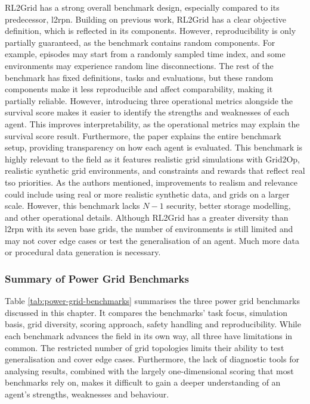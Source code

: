 RL2Grid has a strong overall benchmark design, especially compared to its predecessor, \ac{l2rpn}. Building on previous work, RL2Grid has a clear objective definition, which is reflected in its components. 
However, reproducibility is only partially guaranteed, as the benchmark contains random components. For example, episodes may start from a randomly sampled time index, and some environments may experience random line disconnections. The rest of the benchmark has fixed definitions, tasks and evaluations, but these random components make it less reproducible and affect comparability, making it partially reliable. However, introducing three operational metrics alongside the survival score makes it easier to identify the strengths and weaknesses of each agent. This improves interpretability, as the operational metrics may explain the survival score result. Furthermore, the paper explains the entire benchmark setup, providing transparency on how each agent is evaluated. 
This benchmark is highly relevant to the field as it features realistic grid simulations with Grid2Op, realistic synthetic grid environments, and constraints and rewards that reflect real \ac{tso} priorities. As the authors mentioned, improvements to realism and relevance could include using real or more realistic synthetic data, and grids on a larger scale. However, this benchmark lacks $N-1$ security, better storage modelling, and other operational details. 
Although RL2Grid has a greater diversity than \ac{l2rpn} with its seven base grids, the number of environments is still limited and may not cover edge cases or test the generalisation of an agent. Much more data or procedural data generation is necessary. 


\subsubsection{Summary of Power Grid Benchmarks}
Table \ref{tab:power-grid-benchmarks} summarises the three power grid benchmarks discussed in this chapter. It compares the benchmarks' task focus, simulation basis, grid diversity, scoring approach, safety handling and reproducibility. While each benchmark advances the field in its own way, all three have limitations in common. The restricted number of grid topologies limits their ability to test generalisation and cover edge cases. Furthermore, the lack of diagnostic tools for analysing results, combined with the largely one-dimensional scoring that most benchmarks rely on, makes it difficult to gain a deeper understanding of an agent's strengths, weaknesses and behaviour.


